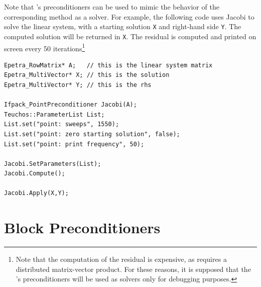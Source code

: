 \smallskip

Note that \ifpack's preconditioners can be used to mimic the behavior
of the corresponding method as a solver. For example, the following code uses
Jacobi to solve the linear system, with a starting solution {\tt X} and
right-hand side {\tt Y}. The computed solution will be returned in {\tt X}.
The residual is computed and printed on screen every 50
iterations\footnote{Note that the computation of the residual is expensive, as
requires a distributed matrix-vector product. For these reasons, it is
supposed that the \ifpack's preconditioners will be used as solvers only for
debugging purposes.}
\begin{verbatim}
Epetra_RowMatrix* A;   // this is the linear system matrix
Epetra_MultiVector* X; // this is the solution
Epetra_MultiVector* Y; // this is the rhs

Ifpack_PointPreconditioner Jacobi(A);
Teuchos::ParameterList List;
List.set("point: sweeps", 1550);
List.set("point: zero starting solution", false);
List.set("point: print frequency", 50);

Jacobi.SetParameters(List);
Jacobi.Compute();

Jacobi.Apply(X,Y);
\end{verbatim}

\section{Block Preconditioners}
\label{sec:block}

